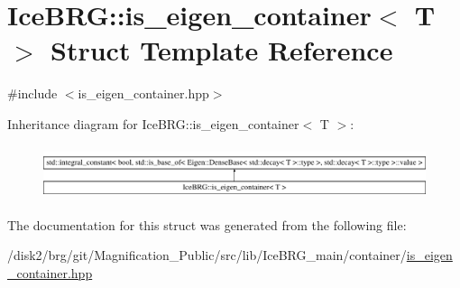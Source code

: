 \hypertarget{structIceBRG_1_1is__eigen__container}{}\section{Ice\+B\+R\+G\+:\+:is\+\_\+eigen\+\_\+container$<$ T $>$ Struct Template Reference}
\label{structIceBRG_1_1is__eigen__container}


{\ttfamily \#include $<$is\+\_\+eigen\+\_\+container.\+hpp$>$}

Inheritance diagram for Ice\+B\+R\+G\+:\+:is\+\_\+eigen\+\_\+container$<$ T $>$\+:\begin{figure}[H]
\begin{center}
\leavevmode
\includegraphics[height=1.577465cm]{structIceBRG_1_1is__eigen__container}
\end{center}
\end{figure}


The documentation for this struct was generated from the following file\+:\begin{DoxyCompactItemize}
\item 
/disk2/brg/git/\+Magnification\+\_\+\+Public/src/lib/\+Ice\+B\+R\+G\+\_\+main/container/\hyperlink{is__eigen__container_8hpp}{is\+\_\+eigen\+\_\+container.\+hpp}\end{DoxyCompactItemize}
